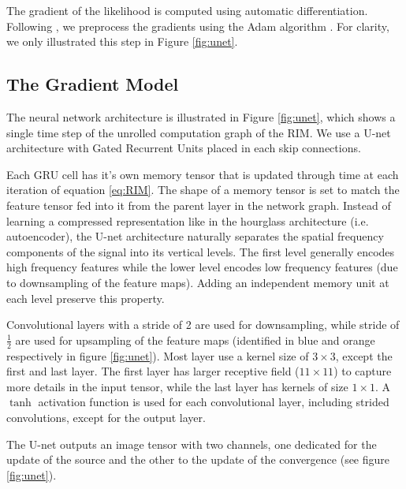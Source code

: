 \documentclass[twocolumn]{aastex631}
\begin{document}
The gradient of the likelihood is computed using automatic differentiation. Following 
\citep{Modi2021}, we preprocess the gradients using the Adam algorithm \citep{Kingma2013}. 
For clarity, we only illustrated this step in Figure \ref{fig:unet}. 


\subsection{The Gradient Model}\label{sec:gradient model}


The neural network architecture is illustrated in Figure \ref{fig:unet}, which shows 
a single time step of the unrolled computation graph of the RIM.
We use a U-net \citep{Ronneberger2015} architecture 
with Gated Recurrent Units \citep[GRU:][]{Cho2014} placed in each skip connections. 

Each GRU cell has it's own memory tensor that is updated through time at each iteration of 
equation \ref{eq:RIM}. The shape of a memory tensor is set to match the
feature tensor fed into it from the parent layer in the network graph. 
Instead of learning a compressed representation like in the hourglass
architecture (i.e. autoencoder), the U-net architecture naturally separates the spatial 
frequency components of the signal into its vertical levels. The first level generally encodes 
high frequency features while the lower level encodes low frequency features (due to downsampling of the feature maps). 
Adding an independent memory unit 
at each level preserve this property.

Convolutional layers with a stride of 2 are used for downsampling, while 
stride of $\frac{1}{2}$ are used for upsampling of the feature maps 
(identified in blue and orange respectively in figure \ref{fig:unet}). 
Most layer use a kernel size of $3\times3$, except the first and last layer. 
The first layer has 
larger receptive field ($11\times11$) to capture more details in the input tensor, 
while the last layer has kernels of size $1\times 1$. 
A $\tanh$ 
activation function is used 
for each convolutional layer, including strided convolutions, except for the output 
layer. 

The U-net outputs an image tensor with two channels, one dedicated for the update of the source 
and the other to the update of the convergence (see figure \ref{fig:unet}). 
\end{document}
